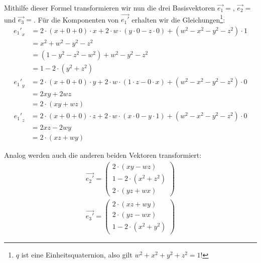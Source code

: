 Mithilfe dieser Formel transformieren wir nun die drei Basisvektoren $\vec{e_1} = $, $\vec{e_2} = $ und $\vec{e_3} = $. Für die Komponenten von $\vec{e_1'}$ erhalten wir die Gleichungen\footnote{$q$ ist eine Einheitsquaternion, also gilt $w^2 + x^2 + y^2 + z^2 = 1$!}:
\begin{equation}
\begin{split}
 {e_1'}_x
  &= 2 \cdot ( x + 0 + 0 ) \cdot x + 2 \cdot w \cdot ( y \cdot 0 - z \cdot 0 ) + ( w^2 - x^2 - y^2 - z^2 ) \cdot 1 \\
  &= x^2 + w^2 - y^2 - z^2 \\
  &= ( 1 - y^2 - z^2 - w^2 ) + w^2 - y^2 - z^2 \\
  &= 1 - 2 \cdot ( y^2 + z^2 )
\end{split}
\end{equation}
\begin{equation}
\begin{split}
 {e_1'}_y
  &= 2 \cdot ( x + 0 + 0 ) \cdot y + 2 \cdot w \cdot ( 1 \cdot z - 0 \cdot x ) + ( w^2 - x^2 - y^2 - z^2 ) \cdot 0 \\
  &= 2xy + 2wz \\
  &= 2 \cdot ( xy + wz )
\end{split}
\end{equation}
\begin{equation}
\begin{split}
 {e_1'}_z
  &= 2 \cdot ( x + 0 + 0 ) \cdot z + 2 \cdot w \cdot ( x \cdot 0 - y \cdot 1 ) + ( w^2 - x^2 - y^2 - z^2 ) \cdot 0 \\
  &= 2xz - 2wy \\
  &= 2 \cdot ( xz + wy )
\end{split}
\end{equation}

Analog werden auch die anderen beiden Vektoren transformiert:
\begin{align}
 \vec{e_2'} =
 \begin{pmatrix}
  2 \cdot ( xy - wz ) \\
  1 - 2 \cdot ( x^2 + z^2 ) \\
  2 \cdot ( yz + wx )
 \end{pmatrix} \\
 \vec{e_3'} =
 \begin{pmatrix}
  2 \cdot ( xz + wy ) \\
  2 \cdot ( yz - wx ) \\
  1 - 2 \cdot ( x^2 + y^2 )
 \end{pmatrix}
\end{align}

